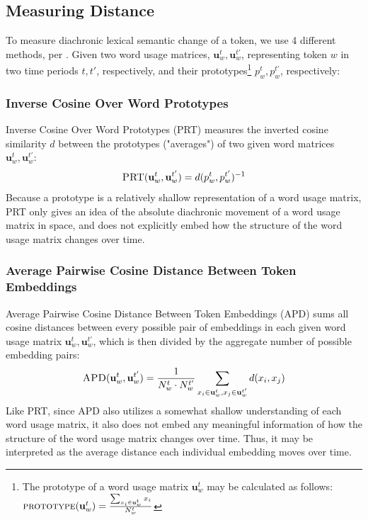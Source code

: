 \documentclass[10pt, a4paper]{article}
\begin{document}
\subsection{Measuring Distance}
\label{distance}
To measure diachronic lexical semantic change of a token, we use 4 different methods, per \cite{Kutuzov2020,Giulianelli2020}. Given two word usage matrices, $\textbf{u}^{t}_w, \textbf{u}^{t'}_w$, representing token $w$ in two time periods $t, t'$, respectively, and their prototypes\footnote{The prototype of a word usage matrix $\textbf{u}^t_w$ may be calculated as follows: $\textsc{prototype}(\textbf{u}^t_w) = \frac{\sum_{x_i \in \textbf{u}^t_w} x_i}{N^t_w}$} $p^{t}_w, p^{t'}_w$, respectively:

\subsubsection{Inverse Cosine Over Word Prototypes}
Inverse Cosine Over Word Prototypes (PRT) measures the inverted cosine similarity $d$ between the prototypes ("averages") of two given word matrices $\textbf{u}^{t}_w, \textbf{u}^{t'}_w$:
$$\textsc{PRT}(\textbf{u}^{t}_w, \textbf{u}^{t'}_w) = d(p^{t}_w, p^{t'}_w)^{-1}$$
Because a prototype is a relatively shallow representation of a word usage matrix, PRT only gives an idea of the absolute diachronic movement of a word usage matrix in space, and does not explicitly embed how the structure of the word usage matrix changes over time.

\subsubsection{Average Pairwise Cosine Distance Between Token Embeddings}
Average Pairwise Cosine Distance Between Token Embeddings (APD) sums all cosine distances between every possible pair of embeddings in each given word usage matrix $\textbf{u}^{t}_w, \textbf{u}^{t'}_w$, which is then divided by the aggregate number of possible embedding pairs:
$$\textsc{APD}(\textbf{u}^{t}_w, \textbf{u}^{t'}_w) = \frac{1}{N^{t}_w \cdot N^{t'}_w} \sum_{x_i \in \textbf{u}^{t}_w, x_j \in \textbf{u}^{t'}_w} d(x_i, x_j)$$
Like PRT, since APD also utilizes a somewhat shallow understanding of each word usage matrix, it also does not embed any meaningful information of how the structure of the word usage matrix changes over time. Thus, it may be interpreted as the average distance each individual embedding moves over time.\\
\end{document}
